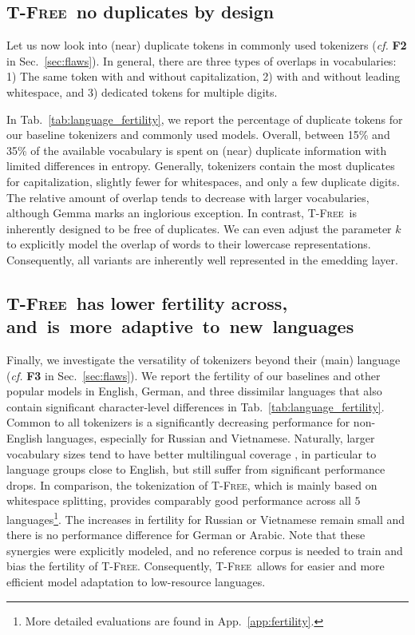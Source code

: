 \documentclass[11pt]{article}
\newcommand\todo[1]{\textcolor{red}{#1}}
\newcommand{\method}{\textsc{T-Free}}
\begin{document}
\subsection{\method\ no duplicates by design}
\label{sec:exp_flaws}
Let us now look into (near) duplicate tokens  in commonly used tokenizers (\emph{cf.} \textbf{F2} in Sec.~\ref{sec:flaws}). In general, there are three types of overlaps in vocabularies: 1) The same token with and without capitalization, 2) with and without leading whitespace, and 3) dedicated tokens for multiple digits. 

In Tab.~\ref{tab:language_fertility}, we report the percentage of duplicate tokens for our baseline tokenizers and commonly used models. Overall, between 15\% and 35\% of the available vocabulary is spent on (near) duplicate information with limited differences in entropy. Generally, tokenizers contain the most duplicates for capitalization, slightly fewer for whitespaces, and only a few duplicate digits. The relative amount of overlap tends to decrease with larger vocabularies, although Gemma marks an inglorious exception.
In contrast, \method~is inherently designed to be free of duplicates.
We can even adjust the parameter $k$ to explicitly model the overlap of words to their lowercase representations. Consequently, all variants are inherently well represented in the emedding layer. 

\subsection{\method\ has lower fertility across, \mbox{and is more adaptive to new languages}}
\label{sec:main_results}

Finally, we investigate the versatility of tokenizers beyond their (main) language (\emph{cf.} \textbf{F3} in Sec.~\ref{sec:flaws}). We report the fertility of our baselines and other popular models in English, German, and three dissimilar languages that also contain significant character-level differences in Tab.~\ref{tab:language_fertility}. Common to all tokenizers is a significantly decreasing performance for non-English languages, especially for Russian and Vietnamese. Naturally, larger vocabulary sizes tend to have better multilingual coverage
, in particular to language groups close to English, but still suffer from significant performance drops. 
In comparison, the tokenization of \method, which is mainly based on whitespace splitting, provides comparably good performance across all $5$ languages\footnote{More detailed evaluations are found in App.~\ref{app:fertility}.}. The increases in fertility for Russian or Vietnamese remain small and there is no performance difference for German or Arabic. 
Note that these synergies were explicitly modeled, and no reference corpus is needed to train and bias the fertility of \method.
Consequently, \method~allows for easier and more efficient model adaptation to low-resource languages. 
\end{document}
